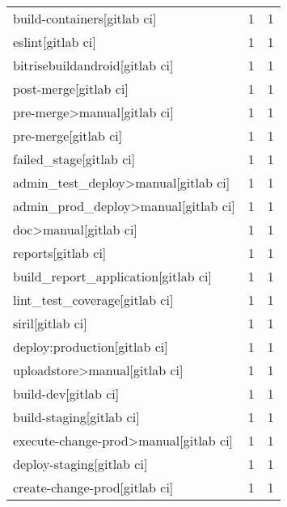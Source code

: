 \begin{tabular}{lrr}
build-containers[gitlab ci]                &                   1 &             1 \\
eslint[gitlab ci]                          &                   1 &             1 \\
bitrisebuildandroid[gitlab ci]             &                   1 &             1 \\
post-merge[gitlab ci]                      &                   1 &             1 \\
pre-merge>manual[gitlab ci]                &                   1 &             1 \\
pre-merge[gitlab ci]                       &                   1 &             1 \\
failed\_stage[gitlab ci]                    &                   1 &             1 \\
admin\_test\_deploy>manual[gitlab ci]        &                   1 &             1 \\
admin\_prod\_deploy>manual[gitlab ci]        &                   1 &             1 \\
doc>manual[gitlab ci]                      &                   1 &             1 \\
reports[gitlab ci]                         &                   1 &             1 \\
build\_report\_application[gitlab ci]        &                   1 &             1 \\
lint\_test\_coverage[gitlab ci]              &                   1 &             1 \\
siril[gitlab ci]                           &                   1 &             1 \\
deploy:production[gitlab ci]               &                   1 &             1 \\
uploadstore>manual[gitlab ci]              &                   1 &             1 \\
build-dev[gitlab ci]                       &                   1 &             1 \\
build-staging[gitlab ci]                   &                   1 &             1 \\
execute-change-prod>manual[gitlab ci]      &                   1 &             1 \\
deploy-staging[gitlab ci]                  &                   1 &             1 \\
create-change-prod[gitlab ci]              &                   1 &             1 \\

\end{tabular}

